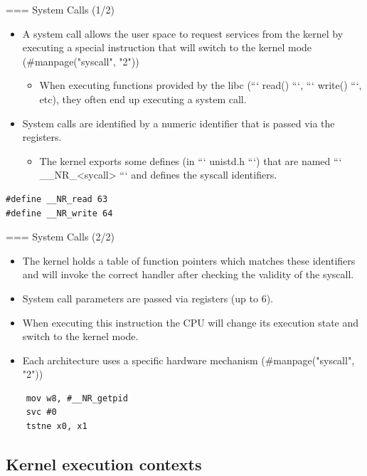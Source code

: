 === System Calls (1/2)
  \begin{itemize}
    \item A system call allows the user space to request services from the
          kernel by executing a special instruction that will switch to the
          kernel mode (#manpage("syscall", "2"))
    \begin{itemize}
      \item When executing functions provided by the libc (``` read() ```,
            ``` write() ```, etc), they often end up executing a system call.
    \end{itemize}
    \item System calls are identified by a numeric identifier that is passed
          via the registers.
    \begin{itemize}
      \item The kernel exports some defines (in ``` unistd.h ```) that are named
            ``` __NR_<sycall> ``` and defines the syscall identifiers.
    \end{itemize}
  \end{itemize}
  \begin{block}{}
    \begin{verbatim}
#define __NR_read 63
#define __NR_write 64
    \end{verbatim}
  \end{block}


=== System Calls (2/2)
  \begin{itemize}
    \item The kernel holds a table of function pointers which matches these
          identifiers and will invoke the correct handler after checking the
          validity of the syscall.
    \item System call parameters are passed via registers (up to 6).
    \item When executing this instruction the CPU will change its execution
    state and switch to the kernel mode.
    \item Each architecture uses a specific hardware mechanism
    (#manpage("syscall", "2"))
  \end{itemize}
  \begin{block}{}
    \begin{verbatim}
    mov w8, #__NR_getpid
    svc #0
    tstne x0, x1
    \end{verbatim}
  \end{block}


\subsection{Kernel execution contexts}

